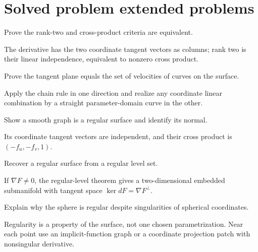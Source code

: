 \section{Solved problem extended problems}
\begin{problem}\label{prob:vii14-01}
Prove the rank-two and cross-product criteria are equivalent.
\end{problem}
\begin{solution}
The derivative has the two coordinate tangent vectors as columns; rank two is their linear independence, equivalent to nonzero cross product.
\end{solution}

\begin{problem}\label{prob:vii14-02}
Prove the tangent plane equals the set of velocities of curves on the surface.
\end{problem}
\begin{solution}
Apply the chain rule in one direction and realize any coordinate linear combination by a straight parameter-domain curve in the other.
\end{solution}

\begin{problem}\label{prob:vii14-03}
Show a smooth graph is a regular surface and identify its normal.
\end{problem}
\begin{solution}
Its coordinate tangent vectors are independent, and their cross product is \((-f_u,-f_v,1)\).
\end{solution}

\begin{problem}\label{prob:vii14-04}
Recover a regular surface from a regular level set.
\end{problem}
\begin{solution}
If \(\nabla F\neq0\), the regular-level theorem gives a two-dimensional embedded submanifold with tangent space \(\ker dF=\nabla F^\perp\).
\end{solution}

\begin{problem}\label{prob:vii14-05}
Explain why the sphere is regular despite singularities of spherical coordinates.
\end{problem}
\begin{solution}
Regularity is a property of the surface, not one chosen parametrization. Near each point use an implicit-function graph or a coordinate projection patch with nonsingular derivative.
\end{solution}

